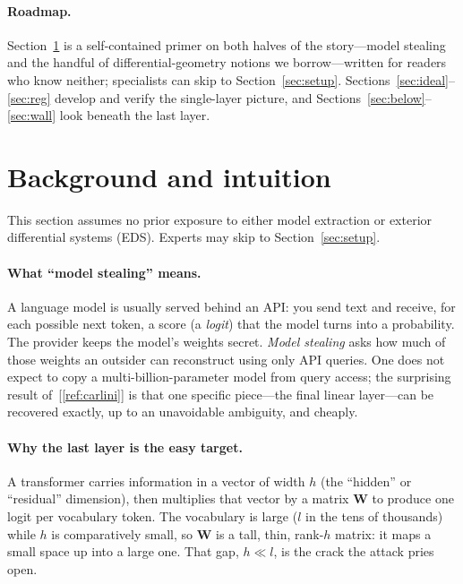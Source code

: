 \documentclass[11pt]{article}
\newcommand{\W}{\mathbf{W}}
\begin{document}
\paragraph{Roadmap.} Section~\ref{sec:background} is a self-contained primer on
both halves of the story---model stealing and the handful of
differential-geometry notions we borrow---written for readers who know neither;
specialists can skip to Section~\ref{sec:setup}. Sections~\ref{sec:ideal}--\ref{sec:reg}
develop and verify the single-layer picture, and
Sections~\ref{sec:below}--\ref{sec:wall} look beneath the last layer.

\section{Background and intuition}\label{sec:background}

This section assumes no prior exposure to either model extraction or exterior
differential systems (EDS). Experts may skip to Section~\ref{sec:setup}.

\paragraph{What ``model stealing'' means.} A language model is usually served
behind an API: you send text and receive, for each possible next token, a score
(a \emph{logit}) that the model turns into a probability. The provider keeps the
model's weights secret. \emph{Model stealing} asks how much of those weights an
outsider can reconstruct using only API queries. One does not expect to copy a
multi-billion-parameter model from query access; the surprising result
of~[\ref{ref:carlini}] is that one specific piece---the final linear layer---can
be recovered exactly, up to an unavoidable ambiguity, and cheaply.

\paragraph{Why the last layer is the easy target.} A transformer carries
information in a vector of width $h$ (the ``hidden'' or ``residual'' dimension),
then multiplies that vector by a matrix $\W$ to produce one logit per
vocabulary token. The vocabulary is large ($l$ in the tens of thousands) while
$h$ is comparatively small, so $\W$ is a tall, thin, rank-$h$ matrix: it maps a
small space up into a large one. That gap, $h\ll l$, is the crack the attack
pries open.
\end{document}
